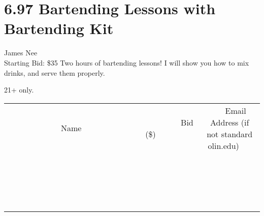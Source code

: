 \documentclass[11pt]{article}
\begin{document}
\section*{6.97 Bartending Lessons with Bartending Kit}
James Nee
\\
Starting Bid: \$35
\newline
Two hours of bartending lessons! I will show you how to mix drinks, and serve them properly.

21+ only.
\\[3ex]
\begin{tabular}{c c c}
~~~~~~~~~~~~~Name~~~~~~~~~~~~~ & ~~~~~~~~~Bid (\$)~~~~~~~~~  & ~~~Email Address (if not standard olin.edu)~~~\\
 & & \\
\hline
 & & \\
\hline
 & & \\
\hline
 & & \\
\hline
 & & \\
\hline
 & & \\
\hline
 & & \\
\hline
 & & \\
\hline
 & & \\
\hline
 & & \\
\hline
 & & \\
\hline
 & & \\
\hline
 & & \\
\hline
 & & \\
\hline
 & & \\
\hline
 & & \\
\hline
 & & \\
\hline
 & & \\
\hline
 & & \\
\hline
\end{tabular}
\newpage
\end{document}
